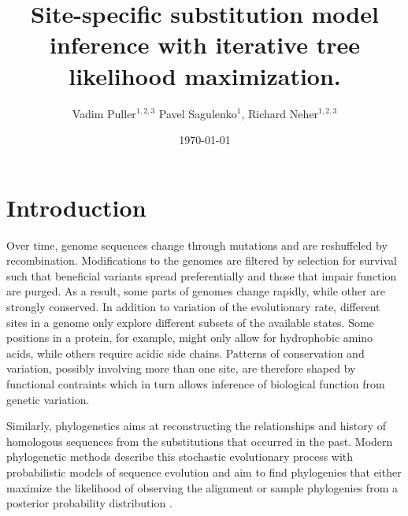 \documentclass[aps,rmp,twocolumn]{revtex4}
\begin{document}
\title{Site-specific substitution model inference with iterative tree likelihood maximization.}
\author{Vadim Puller$^{1,2,3}$ Pavel Sagulenko$^{1}$, Richard Neher$^{1,2,3}$}

\date{\today}

\maketitle

\section*{Introduction}
Over time, genome sequences change through mutations and are reshuffeled by recombination.
Modifications to the genomes are filtered by selection for survival such that beneficial variants spread preferentially and those that impair function are purged.
As a result, some parts of genomes change rapidly, while other are strongly conserved.
In addition to variation of the evolutionary rate, different sites in a genome only explore different subsets of the available states.
Some positions in a protein, for example, might only allow for hydrophobic amino acids, while others require acidic side chains.
Patterns of conservation and variation, possibly involving more than one site, are therefore shaped by functional contraints which in turn allows inference of biological function from genetic variation.

Similarly, phylogenetics aims at reconstructing the relationships and history of homologous sequences from the substitutions that occurred in the past.
Modern phylogenetic methods describe this stochastic evolutionary process with probabilistic models of sequence evolution and aim to find phylogenies that either maximize the likelihood of observing the alignment or sample phylogenies from a posterior probability distribution \citep{felsenstein2004inferring}.
\end{document}

